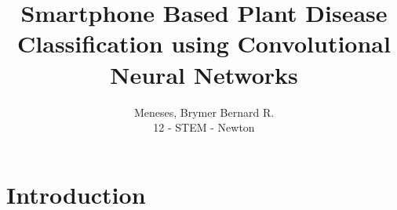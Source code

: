 \documentclass[a4paper, 12pt]{report}
\title{
    Smartphone Based Plant Disease Classification using
    Convolutional Neural Networks
}
\author{
    Meneses, Brymer Bernard R. \\[-4mm]
    {\small 12 - STEM - Newton}
}
\date{}
\begin{document}
 
    \maketitle 



    \chapter{Introduction}
    
    
\end{document}
